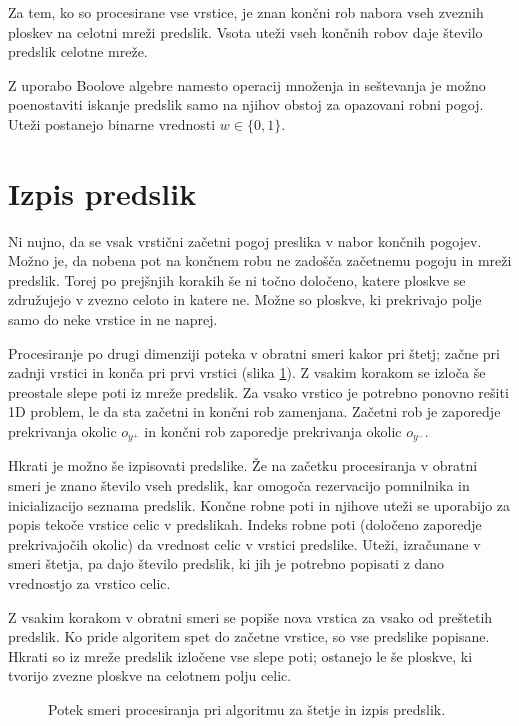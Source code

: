 \documentclass[12pt,a4paper,openany,twoside]{book}
\begin{document}
Za tem, ko so procesirane vse vrstice, je znan končni rob nabora vseh zveznih ploskev na celotni mreži predslik.
Vsota uteži vseh končnih robov daje število predslik celotne mreže.

Z uporabo Boolove algebre namesto operacij množenja in seštevanja
je možno poenostaviti iskanje predslik samo na njihov obstoj za opazovani robni pogoj.
Uteži postanejo binarne vrednosti \(w \in \{0, 1\}\).

\section{Izpis predslik}

Ni nujno, da se vsak vrstični začetni pogoj preslika v nabor končnih pogojev.
Možno je, da nobena pot na končnem robu ne zadošča začetnemu pogoju in mreži predslik.
Torej po prejšnjih korakih še ni točno določeno, katere ploskve se združujejo v zvezno
celoto in katere ne. Možne so ploskve, ki prekrivajo polje samo do neke vrstice in ne naprej.

Procesiranje po drugi dimenziji poteka v obratni smeri kakor pri štetj;
začne pri zadnji vrstici in konča pri prvi vrstici (slika \ref{algorithm_list}).
Z vsakim korakom se izloča še preostale slepe poti iz mreže predslik.
Za vsako vrstico je potrebno ponovno rešiti 1D problem,
le da sta začetni in končni rob zamenjana.
Začetni rob je zaporedje prekrivanja okolic \(o_{y^+}\)
in končni rob zaporedje prekrivanja okolic \(o_{y^-}\).

Hkrati je možno še izpisovati predslike. Že na začetku procesiranja v obratni smeri
je znano število vseh predslik, kar omogoča rezervacijo pomnilnika in inicializacijo seznama predslik.
Končne robne poti in njihove uteži se uporabijo za popis tekoče vrstice celic v predslikah.
Indeks robne poti (določeno zaporedje prekrivajočih okolic) da vrednost celic v vrstici predslike.
Uteži, izračunane v smeri štetja, pa dajo število predslik,
ki jih je potrebno popisati z dano vrednostjo za vrstico celic.

Z vsakim korakom v obratni smeri se popiše nova vrstica za vsako od preštetih predslik.
Ko pride algoritem spet do začetne vrstice, so vse predslike popisane.
Hkrati so iz mreže predslik izločene vse slepe poti; ostanejo le še ploskve,
ki tvorijo zvezne ploskve na celotnem polju celic.

\begin{figure}[htb]
\centerline{}
\caption[Algoritem za izpis predslik.]{Potek smeri procesiranja pri algoritmu za štetje in izpis predslik.}
\label{algorithm_list}
\end{figure}
\end{document}
